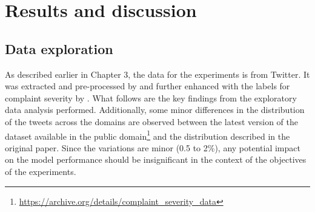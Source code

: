 \chapter{Results and discussion}

\section{Data exploration}
As described earlier in Chapter 3, the data for the experiments is from Twitter. It was extracted and pre-processed by \cite{preotiuc-pietro_automatically_2019} and further enhanced with the labels for complaint severity by \cite{jinModelingSeverityComplaints2021}. What follows are the key findings from the exploratory data analysis performed. Additionally, some minor differences in the distribution of the tweets across the domains are observed between the latest version of the dataset available in the public domain\footnote{\url{https://archive.org/details/complaint_severity_data}} and the distribution described in the original paper. Since the variations are minor (0.5 to 2\%), any potential impact on the model performance should be insignificant in the context of the objectives of the experiments.

